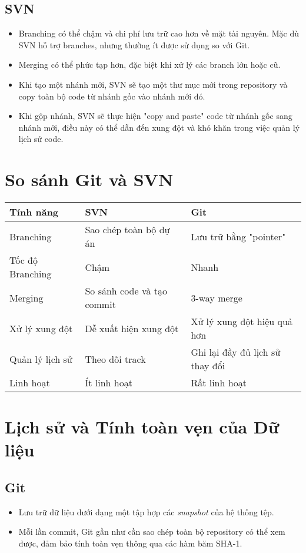 \subsection{SVN}
\begin{itemize}
    \item Branching có thể chậm và chi phí lưu trữ cao hơn về mặt tài nguyên. Mặc dù SVN hỗ trợ branches, nhưng thường ít được sử dụng so với Git.
    \item Merging có thể phức tạp hơn, đặc biệt khi xử lý các branch lớn hoặc cũ.
    \item Khi tạo một nhánh mới, SVN sẽ tạo một thư mục mới trong repository và copy toàn bộ code từ nhánh gốc vào nhánh mới đó.
    \item Khi gộp nhánh, SVN sẽ thực hiện "copy and paste" code từ nhánh gốc sang nhánh mới, điều này có thể dẫn đến xung đột và khó khăn trong việc quản lý lịch sử code.
\end{itemize}

\section{So sánh Git và SVN}
\begin{longtable}{|l|l|l|}
    \hline
    Tính năng & SVN & Git \\ \hline
    Branching & Sao chép toàn bộ dự án & Lưu trữ bằng "pointer" \\ \hline
    Tốc độ Branching & Chậm & Nhanh \\ \hline
    Merging & So sánh code và tạo commit & 3-way merge \\ \hline
    Xử lý xung đột & Dễ xuất hiện xung đột & Xử lý xung đột hiệu quả hơn \\ \hline
    Quản lý lịch sử & Theo dõi track & Ghi lại đầy đủ lịch sử thay đổi \\ \hline
    Linh hoạt & Ít linh hoạt & Rất linh hoạt \\ \hline
\end{longtable}
\section{Lịch sử và Tính toàn vẹn của Dữ liệu}
\subsection{Git}
\begin{itemize}
    \item Lưu trữ dữ liệu dưới dạng một tập hợp các \textit{snapshot} của hệ thống tệp.
    \item Mỗi lần commit, Git gần như cần sao chép toàn bộ repository có thể xem được, đảm bảo tính toàn vẹn thông qua các hàm băm SHA-1.
\end{itemize}

